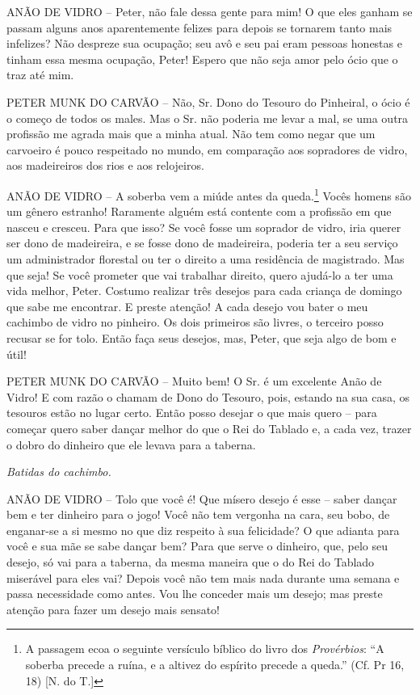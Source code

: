 ANÃO DE VIDRO -- Peter, não fale dessa gente para mim! O que eles ganham
se passam alguns anos aparentemente felizes para depois se tornarem
tanto mais infelizes? Não despreze sua ocupação; seu avô e seu pai eram
pessoas honestas e tinham essa mesma ocupação, Peter! Espero que não
seja amor pelo ócio que o traz até mim.

PETER MUNK DO CARVÃO -- Não, Sr. Dono do Tesouro do Pinheiral, o ócio é
o começo de todos os males. Mas o Sr. não poderia me levar a mal, se uma
outra profissão me agrada mais que a minha atual. Não tem como negar que
um carvoeiro é pouco respeitado no mundo, em comparação aos sopradores
de vidro, aos madeireiros dos rios e aos relojeiros.

ANÃO DE VIDRO -- A soberba vem a miúde antes da queda.\footnote{A
  passagem ecoa o seguinte versículo bíblico do livro dos
  \emph{Provérbios}: ``A soberba precede a ruína, e a altivez do
  espírito precede a queda.'' (Cf. Pr 16, 18) {[}N. do T.{]}} Vocês
homens são um gênero estranho! Raramente alguém está contente com a
profissão em que nasceu e cresceu. Para que isso? Se você fosse um
soprador de vidro, iria querer ser dono de madeireira, e se fosse dono
de madeireira, poderia ter a seu serviço um administrador florestal ou
ter o direito a uma residência de magistrado. Mas que seja! Se você
prometer que vai trabalhar direito, quero ajudá-lo a ter uma vida
melhor, Peter. Costumo realizar três desejos para cada criança de
domingo que sabe me encontrar. E preste atenção! A cada desejo vou bater
o meu cachimbo de vidro no pinheiro. Os dois primeiros são livres, o
terceiro posso recusar se for tolo. Então faça seus desejos, mas, Peter,
que seja algo de bom e útil!

PETER MUNK DO CARVÃO -- Muito bem! O Sr. é um excelente Anão de Vidro! E
com razão o chamam de Dono do Tesouro, pois, estando na sua casa, os
tesouros estão no lugar certo. Então posso desejar o que mais quero --
para começar quero saber dançar melhor do que o Rei do Tablado e, a cada
vez, trazer o dobro do dinheiro que ele levava para a taberna.

\emph{Batidas do cachimbo.}

ANÃO DE VIDRO -- Tolo que você é! Que mísero desejo é esse -- saber
dançar bem e ter dinheiro para o jogo! Você não tem vergonha na cara,
seu bobo, de enganar-se a si mesmo no que diz respeito à sua felicidade?
O que adianta para você e sua mãe se sabe dançar bem? Para que serve o
dinheiro, que, pelo seu desejo, só vai para a taberna, da mesma maneira
que o do Rei do Tablado miserável para eles vai? Depois você não tem
mais nada durante uma semana e passa necessidade como antes. Vou lhe
conceder mais um desejo; mas preste atenção para fazer um desejo mais
sensato!

